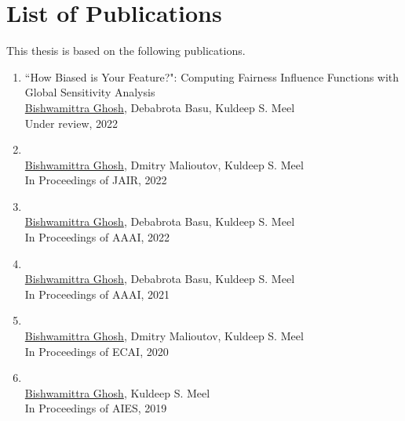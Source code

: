 
\section*{List of Publications}
This thesis is based on the following publications.

\begin{enumerate}
	
	\item ``How Biased is Your Feature?": Computing Fairness Influence Functions with Global Sensitivity Analysis\\
	\underline{Bishwamittra Ghosh}, Debabrota Basu, Kuldeep S. Meel\\
	Under review, 2022
	
	\item \href{https://arxiv.org/pdf/2205.06936.pdf}{} \\
	\underline{Bishwamittra Ghosh}, Dmitry Malioutov, Kuldeep S. Meel\\
	In Proceedings of JAIR, 2022
	
	\item \href{https://arxiv.org/pdf/2109.09447.pdf}{} \\
	\underline{Bishwamittra Ghosh}, Debabrota Basu, Kuldeep S. Meel\\
	In Proceedings of AAAI, 2022
		
	\item \href{https://arxiv.org/pdf/2009.06516.pdf}{} \\
	\underline{Bishwamittra Ghosh}, Debabrota Basu, Kuldeep S. Meel\\
	In Proceedings of AAAI, 2021
	
	
	\item \href{https://bishwamittra.github.io/publication/ecai_2020/paper.pdf}{} \\
	\underline{Bishwamittra Ghosh}, Dmitry Malioutov, Kuldeep S. Meel\\
	In Proceedings of ECAI, 2020
	
	\item \href{https://bishwamittra.github.io/publication/imli-ghosh.pdf}{}\\
	\underline{Bishwamittra Ghosh}, Kuldeep S. Meel\\
	In Proceedings of AIES, 2019
	
	
\end{enumerate}
\clearpage
